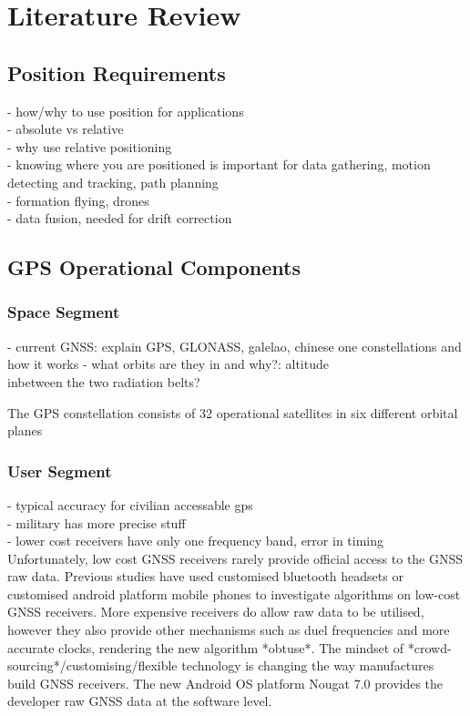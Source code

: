 
\def\chapdir{./ChapterLiteratureReview}

\chapter{Literature Review} \label{ch:litreview}



\section{Position Requirements}
- how/why to use position for applications\\
- absolute vs relative\\
- why use relative positioning\\
- knowing where you are positioned is important for data gathering, motion detecting and tracking, path planning\\
- formation flying, drones\\
- data fusion, needed for drift correction

\section{GPS Operational Components}
\subsection{Space Segment}
- current GNSS: explain GPS, GLONASS, galelao, chinese one constellations and how it works
- what orbits are they in and why?: altitude\\
inbetween the two radiation belts?

The GPS constellation consists of 32 operational satellites in six different orbital planes



\subsection{User Segment}
- typical accuracy for civilian accessable gps\\
- military has more precise stuff\\
- lower cost receivers have only one frequency band, error in timing\\
Unfortunately, low cost GNSS receivers rarely provide official access to the GNSS raw data. Previous studies have used customised bluetooth headsets or customised android platform mobile phones to investigate algorithms on low-cost GNSS receivers. More expensive receivers do allow raw data to be utilised, however they also provide other mechanisms such as duel frequencies and more accurate clocks, rendering the new algorithm *obtuse*. The mindset of *crowd-sourcing*/customising/flexible technology is changing the way manufactures build GNSS receivers. The new Android OS platform Nougat 7.0 provides the developer raw GNSS data at the software level.  

